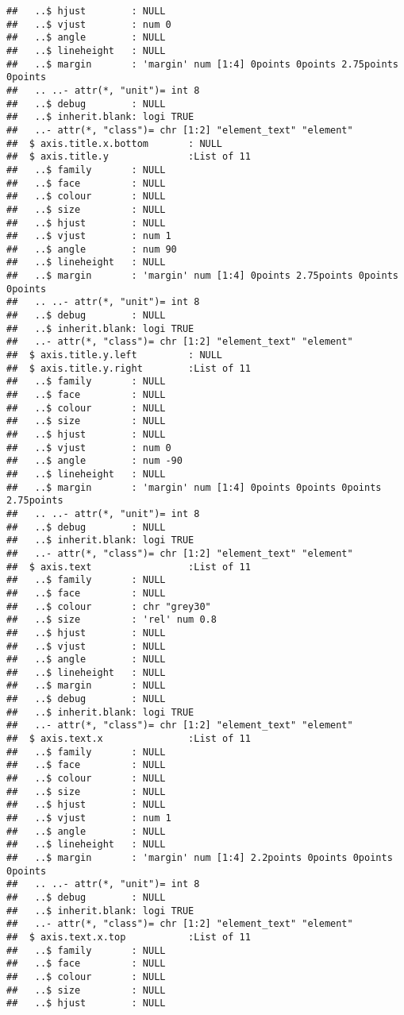\documentclass[
]{article}
\begin{document}
\begin{verbatim}
##   ..$ hjust        : NULL
##   ..$ vjust        : num 0
##   ..$ angle        : NULL
##   ..$ lineheight   : NULL
##   ..$ margin       : 'margin' num [1:4] 0points 0points 2.75points 0points
##   .. ..- attr(*, "unit")= int 8
##   ..$ debug        : NULL
##   ..$ inherit.blank: logi TRUE
##   ..- attr(*, "class")= chr [1:2] "element_text" "element"
##  $ axis.title.x.bottom       : NULL
##  $ axis.title.y              :List of 11
##   ..$ family       : NULL
##   ..$ face         : NULL
##   ..$ colour       : NULL
##   ..$ size         : NULL
##   ..$ hjust        : NULL
##   ..$ vjust        : num 1
##   ..$ angle        : num 90
##   ..$ lineheight   : NULL
##   ..$ margin       : 'margin' num [1:4] 0points 2.75points 0points 0points
##   .. ..- attr(*, "unit")= int 8
##   ..$ debug        : NULL
##   ..$ inherit.blank: logi TRUE
##   ..- attr(*, "class")= chr [1:2] "element_text" "element"
##  $ axis.title.y.left         : NULL
##  $ axis.title.y.right        :List of 11
##   ..$ family       : NULL
##   ..$ face         : NULL
##   ..$ colour       : NULL
##   ..$ size         : NULL
##   ..$ hjust        : NULL
##   ..$ vjust        : num 0
##   ..$ angle        : num -90
##   ..$ lineheight   : NULL
##   ..$ margin       : 'margin' num [1:4] 0points 0points 0points 2.75points
##   .. ..- attr(*, "unit")= int 8
##   ..$ debug        : NULL
##   ..$ inherit.blank: logi TRUE
##   ..- attr(*, "class")= chr [1:2] "element_text" "element"
##  $ axis.text                 :List of 11
##   ..$ family       : NULL
##   ..$ face         : NULL
##   ..$ colour       : chr "grey30"
##   ..$ size         : 'rel' num 0.8
##   ..$ hjust        : NULL
##   ..$ vjust        : NULL
##   ..$ angle        : NULL
##   ..$ lineheight   : NULL
##   ..$ margin       : NULL
##   ..$ debug        : NULL
##   ..$ inherit.blank: logi TRUE
##   ..- attr(*, "class")= chr [1:2] "element_text" "element"
##  $ axis.text.x               :List of 11
##   ..$ family       : NULL
##   ..$ face         : NULL
##   ..$ colour       : NULL
##   ..$ size         : NULL
##   ..$ hjust        : NULL
##   ..$ vjust        : num 1
##   ..$ angle        : NULL
##   ..$ lineheight   : NULL
##   ..$ margin       : 'margin' num [1:4] 2.2points 0points 0points 0points
##   .. ..- attr(*, "unit")= int 8
##   ..$ debug        : NULL
##   ..$ inherit.blank: logi TRUE
##   ..- attr(*, "class")= chr [1:2] "element_text" "element"
##  $ axis.text.x.top           :List of 11
##   ..$ family       : NULL
##   ..$ face         : NULL
##   ..$ colour       : NULL
##   ..$ size         : NULL
##   ..$ hjust        : NULL

\end{verbatim}
\end{document}
